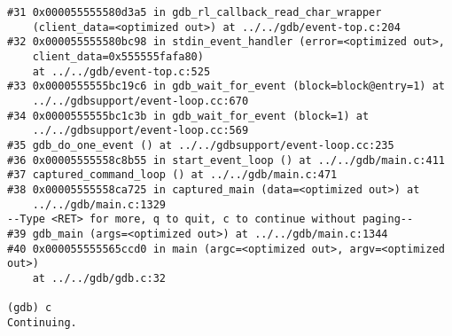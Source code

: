 \documentclass{report}
\begin{document}
\begin{verbatim}
#31 0x000055555580d3a5 in gdb_rl_callback_read_char_wrapper 
    (client_data=<optimized out>) at ../../gdb/event-top.c:204
#32 0x000055555580bc98 in stdin_event_handler (error=<optimized out>, 
    client_data=0x555555fafa80)
    at ../../gdb/event-top.c:525
#33 0x0000555555bc19c6 in gdb_wait_for_event (block=block@entry=1) at 
    ../../gdbsupport/event-loop.cc:670
#34 0x0000555555bc1c3b in gdb_wait_for_event (block=1) at 
    ../../gdbsupport/event-loop.cc:569
#35 gdb_do_one_event () at ../../gdbsupport/event-loop.cc:235
#36 0x00005555558c8b55 in start_event_loop () at ../../gdb/main.c:411
#37 captured_command_loop () at ../../gdb/main.c:471
#38 0x00005555558ca725 in captured_main (data=<optimized out>) at 
    ../../gdb/main.c:1329
--Type <RET> for more, q to quit, c to continue without paging--
#39 gdb_main (args=<optimized out>) at ../../gdb/main.c:1344
#40 0x000055555565ccd0 in main (argc=<optimized out>, argv=<optimized out>) 
    at ../../gdb/gdb.c:32

(gdb) c
Continuing.


\end{verbatim}
\end{document}
